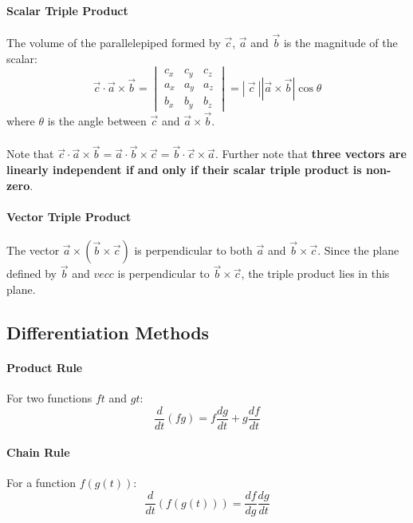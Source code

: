 \documentclass[11pt]{article}
\begin{document}
\paragraph{Scalar Triple Product}
The volume of the parallelepiped formed by $\vec{c}$, $\vec{a}$ and $\vec{b}$ is the magnitude of the scalar:\\
\begin{equation}
    \label{eq:equation8}
    \vec{c} \cdot \vec{a} \times \vec{b} =
    \begin{vmatrix}
        c_x & c_y & c_z \\
        a_x & a_y & a_z \\
        b_x & b_y & b_z
    \end{vmatrix}
    = |\: \vec{c}\:|  |\vec{a} \times \vec{b}| \cos \theta
\end{equation}
where $\theta$ is the angle between $\vec{c}$ and $\vec{a} \times \vec{b}$.\\
\\Note that $\vec{c} \cdot \vec{a} \times \vec{b} = \vec{a} \cdot \vec{b} \times \vec{c} = \vec{b} \cdot \vec{c} \times \vec{a}$.
Further note that \textbf{three vectors are linearly independent if and only if their scalar triple product is non-zero}.
\paragraph{Vector Triple Product}
The vector $\vec{a} \times (\vec{b} \times \vec{c})$ is perpendicular to both $\vec{a}$ and $\vec{b} \times \vec{c}$.
Since the plane defined by $\vec{b}$ and $vec{c}$ is perpendicular to $\vec{b} \times \vec{c}$, the triple product lies in this
plane.
\subsection{Differentiation Methods}\label{subsec:differentiation-methods}
\paragraph{Product Rule}
For two functions $f{t}$ and $g{t}$:
    \begin{equation}
        \label{eq:equation9}
        \frac{d}{dt}(fg) = f\frac{dg}{dt} + g \frac{df}{dt}
    \end{equation}
\paragraph{Chain Rule}
For a function $f(g(t))$:
    \begin{equation}
        \label{eq:equation10}
        \frac{d}{dt}(f(g(t))) = \frac{df}{dg}\frac{dg}{dt}
    \end{equation}
\end{document}
